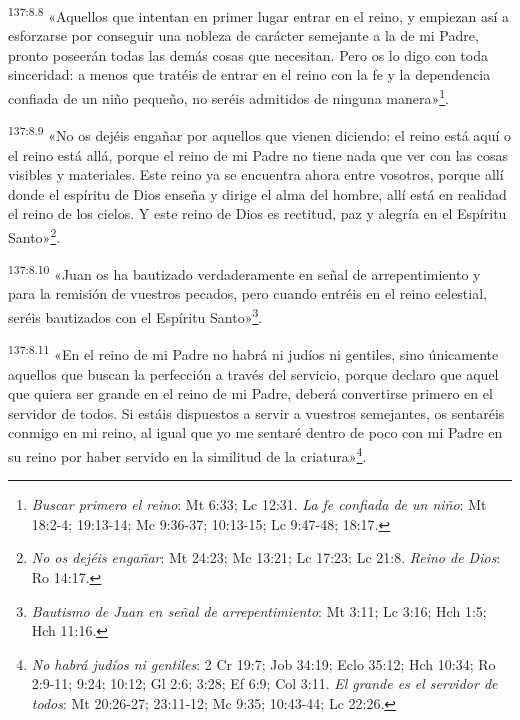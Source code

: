 \par 
\textsuperscript{137:8.8} «Aquellos que intentan en primer lugar entrar en el reino, y empiezan así a esforzarse por conseguir una nobleza de carácter semejante a la de mi Padre, pronto poseerán todas las demás cosas que necesitan. Pero os lo digo con toda sinceridad: a menos que tratéis de entrar en el reino con la fe y la dependencia confiada de un niño pequeño, no seréis admitidos de ninguna manera»\footnote{\textit{Buscar primero el reino}: Mt 6:33; Lc 12:31. \textit{La fe confiada de un niño}: Mt 18:2-4; 19:13-14; Mc 9:36-37; 10:13-15; Lc 9:47-48; 18:17.}.

\par 
\textsuperscript{137:8.9} «No os dejéis engañar por aquellos que vienen diciendo: el reino está aquí o el reino está allá, porque el reino de mi Padre no tiene nada que ver con las cosas visibles y materiales. Este reino ya se encuentra ahora entre vosotros, porque allí donde el espíritu de Dios enseña y dirige el alma del hombre, allí está en realidad el reino de los cielos. Y este reino de Dios es rectitud, paz y alegría en el Espíritu Santo»\footnote{\textit{No os dejéis engañar}: Mt 24:23; Mc 13:21; Lc 17:23; Lc 21:8. \textit{Reino de Dios}: Ro 14:17.}.

\par 
\textsuperscript{137:8.10} «Juan os ha bautizado verdaderamente en señal de arrepentimiento y para la remisión de vuestros pecados, pero cuando entréis en el reino celestial, seréis bautizados con el Espíritu Santo»\footnote{\textit{Bautismo de Juan en señal de arrepentimiento}: Mt 3:11; Lc 3:16; Hch 1:5; Hch 11:16.}.

\par 
\textsuperscript{137:8.11} «En el reino de mi Padre no habrá ni judíos ni gentiles, sino únicamente aquellos que buscan la perfección a través del servicio, porque declaro que aquel que quiera ser grande en el reino de mi Padre, deberá convertirse primero en el servidor de todos. Si estáis dispuestos a servir a vuestros semejantes, os sentaréis conmigo en mi reino, al igual que yo me sentaré dentro de poco con mi Padre en su reino por haber servido en la similitud de la criatura»\footnote{\textit{No habrá judíos ni gentiles}: 2 Cr 19:7; Job 34:19; Eclo 35:12; Hch 10:34; Ro 2:9-11; 9:24; 10:12; Gl 2:6; 3:28; Ef 6:9; Col 3:11. \textit{El grande es el servidor de todos}: Mt 20:26-27; 23:11-12; Mc 9:35; 10:43-44; Lc 22:26.}.

